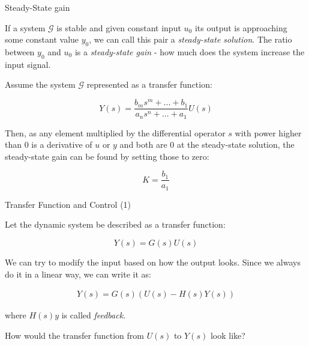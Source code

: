 \documentclass{beamer}
\begin{document}
\begin{frame}{Steady-State gain}
	\begin{flushleft}
		
		If a system  $\mathcal{G}$ is stable and given constant input $u_0$ its output is approaching some constant value $y_0$, we can call this pair a \emph{steady-state solution}. The ratio between $y_0$ and $u_0$ is a \emph{steady-state gain} - how much does the system increase the input signal.
		
		Assume the system  $\mathcal{G}$ represented as a transfer function:
		
		\begin{equation}
			Y(s) = \frac{b_m s^m + ... + b_1}{a_n s^n + ... + a_1} U(s)
		\end{equation}
	
		Then, as any element multiplied by the differential operator $s$ with power higher than 0 is a derivative of $u$ or $y$ and both are 0 at the steady-state solution, the steady-state gain can be found by setting those to zero:
		
		\begin{equation}
			K = \frac{b_1}{a_1}
		\end{equation}		
		
		
		
	\end{flushleft}
\end{frame}



\begin{frame}{Transfer Function and Control (1)}
	\begin{flushleft}
		
		Let the dynamic system be described as a transfer function:
		
		\begin{equation}
			Y(s) = G(s) U(s)
		\end{equation}
		
		We can try to modify the input based on how the output looks. Since we always do it in a linear way, we can write it as:
		
		\begin{align}
			Y(s) = G(s) (U(s) - H(s) Y(s)) 
		\end{align}
		
		where $H(s) y$ is called \emph{feedback}.
		
		\bigskip
		
		How would the transfer function from $U(s)$ to $Y(s) $ look like? 
		
	\end{flushleft}
\end{frame}
\end{document}
